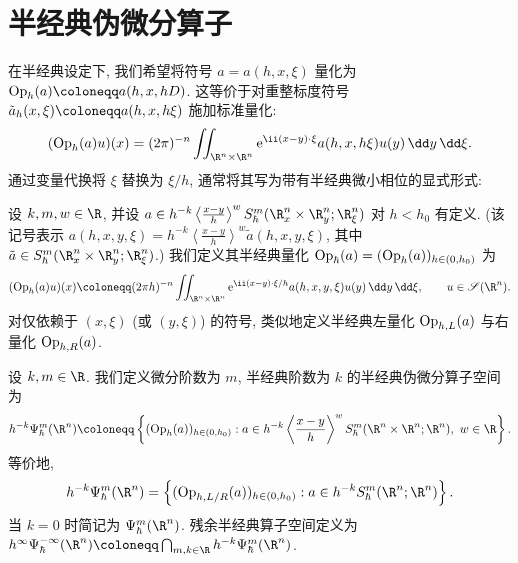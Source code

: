\section{半经典伪微分算子}\label{sec:4.9}
%
%

在半经典设定下, 我们希望将符号 $a = a(h, x, \xi)$ 量化为 $\Op_h(a) \defeq a(h, x, h D)$. 这等价于对重整标度符号 $\tilde{a}_h(x, \xi) \defeq a(h, x, h \xi)$ 施加标准量化:
\begin{equation}\label{eq:4.129}
    (\Op_h(a) u)(x) = (2\pi)^{-n} \iint_{\R^n \times \R^n} \ee^{\ii (x-y) \cdot \xi} a(h, x, h \xi) u(y) \,\dd y \,\dd\xi.
\end{equation}
通过变量代换将 $\xi$ 替换为 $\xi / h$, 通常将其写为带有半经典微小相位的显式形式:

\begin{definition}[半经典量化]\label{def:4.43}
设 $k, m, w \in \R$, 并设 $a \in h^{-k} \left\langle \frac{x-y}{h} \right\rangle^w S_\hbar^m(\R_x^n \times \R_y^n; \R_\xi^n)$ 对 $h < h_0$ 有定义. (该记号表示 $a(h, x, y, \xi) = h^{-k} \left\langle \frac{x-y}{h} \right\rangle^w \tilde{a}(h, x, y, \xi)$, 其中 $\tilde{a} \in S_\hbar^m(\R_x^n \times \R_y^n; \R_\xi^n)$.) 我们定义其半经典量化 $\operatorname{Op}_\hbar(a) = (\operatorname{Op}_h(a))_{h \in (0, h_0)}$ 为
\begin{equation}\label{eq:4.130}
    (\Op_h(a) u)(x) \defeq (2\pi h)^{-n} \iint_{\R^n \times \R^n} \ee^{\ii (x-y) \cdot \xi / h} a(h, x, y, \xi) u(y) \,\dd y \,\dd\xi, \qquad u \in \Schwartz(\R^n).
\end{equation}
对仅依赖于 $(x, \xi)$ (或 $(y, \xi)$) 的符号, 类似地定义半经典左量化 $\operatorname{Op}_{h, L}(a)$ 与右量化 $\operatorname{Op}_{h, R}(a)$.
\end{definition}

\begin{definition}[半经典伪微分算子空间]\label{def:4.44}
设 $k, m \in \R$. 我们定义微分阶数为 $m$, 半经典阶数为 $k$ 的半经典伪微分算子空间为
\begin{equation}\label{eq:4.131}
    h^{-k} \Psi_\hbar^m(\R^n) \defeq \left\{ (\Op_h(a))_{h \in (0, h_0)} : a \in h^{-k} \left\langle \frac{x-y}{h} \right\rangle^w S_\hbar^m(\R^n \times \R^n; \R^n), \ w \in \R \right\}.
\end{equation}
等价地,
\begin{equation}\label{eq:4.132}
    h^{-k} \Psi_\hbar^m(\R^n) = \left\{ (\Op_{h, L/R}(a))_{h \in (0, h_0)} : a \in h^{-k} S_\hbar^m(\R^n; \R^n) \right\}.
\end{equation}
当 $k = 0$ 时简记为 $\Psi_\hbar^m(\R^n)$. 残余半经典算子空间定义为 $h^\infty \Psi_\hbar^{-\infty}(\R^n) \defeq \bigcap_{m, k \in \R} h^{-k} \Psi_\hbar^m(\R^n)$.
\end{definition}

